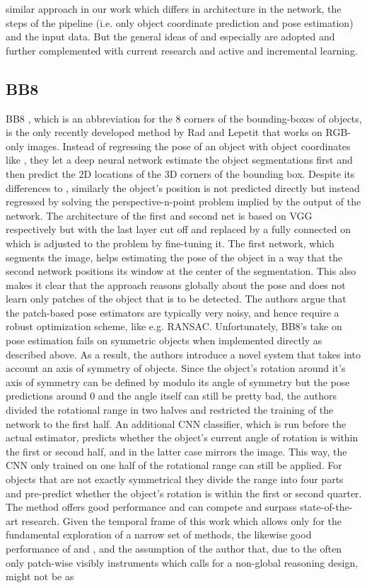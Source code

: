 similar approach in our work which differs in architecture in the network, the steps of the pipeline (i.e. only object coordinate prediction and pose estimation) and the input data. But the general ideas of \cite{pertsch} and especially \cite{brachmann1} are adopted and further complemented with current research and active and incremental learning.

\subsection{BB8}

BB8 \cite{bb8}, which is an abbreviation for the 8 corners of the bounding-boxes of objects, is the only recently developed method by Rad and Lepetit that works on RGB-only images. Instead of regressing the pose of an object with object coordinates like \cite{brachmann1}, they let a deep neural network estimate the object segmentations first and then predict the 2D locations of the 3D corners of the bounding box. Despite its differences to \cite{brachmann1}, similarly the object's position is not predicted directly but instead regressed by solving the perspective-n-point problem implied by the output of the network. The architecture of the first and second net is based on VGG respectively but with the last layer cut off and replaced by a fully connected on which is adjusted to the problem by fine-tuning it. The first network, which segments the image, helps estimating the pose of the object in a way that the second network positions its window at the center of the segmentation. This also makes it clear that the approach reasons globally about the pose and does not learn only patches of the object that is to be detected. The authors argue that the patch-based pose estimators are typically very noisy, and hence require a robust optimization scheme, like e.g. RANSAC. Unfortunately, BB8's take on pose estimation fails on symmetric objects when implemented directly as described above. As a result, the authors introduce a novel system that takes into account an axis of symmetry of objects. Since the object's rotation around it's axis of symmetry can be defined by modulo its angle of symmetry but the pose predictions around 0 and the angle itself can still be pretty bad, the authors divided the rotational range in two halves and restricted the training of the network to the first half. An additional CNN classifier, which is run before the actual estimator, predicts whether the object's current angle of rotation is within the first or second half, and in the latter case mirrors the image. This way, the CNN only trained on one half of the rotational range can still be applied. For objects that are not exactly symmetrical they divide the range into four parts and pre-predict whether the object's rotation is within the first or second quarter. The method offers good performance and can compete and surpass state-of-the-art research. Given the temporal frame of this work which allows only for the fundamental exploration of a narrow set of methods, the likewise good performance of \cite{brachmann2} and \cite{pertsch}, and the assumption of the author that, due to the often only patch-wise visibly instruments which calls for a non-global reasoning design, \cite{bb8} might not be as 